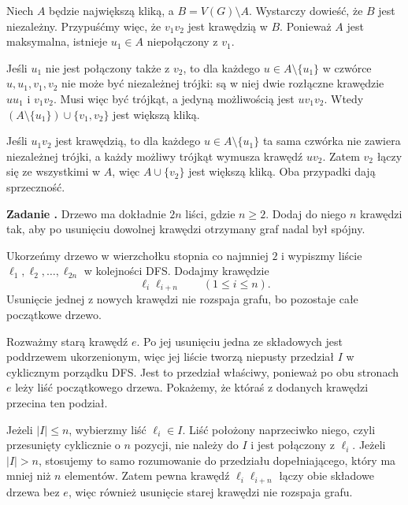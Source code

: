 \documentclass{lecture-kuznia}
\newcounter{zadanie}
\newenvironment{zadanie}[1]{%
	\refstepcounter{zadanie}%
	\par\medskip\noindent
	\textbf{Zadanie \thezadanie.}\quad
}{\par\medskip}
\begin{document}
\begin{solutionbox}
	Niech $A$ będzie największą kliką, a $B=V(G)\setminus A$. Wystarczy dowieść,
	że $B$ jest niezależny. Przypuśćmy więc, że $v_1v_2$ jest krawędzią w $B$.
	Ponieważ $A$ jest maksymalna, istnieje $u_1\in A$ niepołączony z $v_1$.

	Jeśli $u_1$ nie jest połączony także z $v_2$, to dla każdego
	$u\in A\setminus\{u_1\}$ w czwórce $u,u_1,v_1,v_2$ nie może być niezależnej
	trójki: są w niej dwie rozłączne krawędzie $uu_1$ i $v_1v_2$. Musi więc być
	trójkąt, a jedyną możliwością jest $uv_1v_2$. Wtedy
	$(A\setminus\{u_1\})\cup\{v_1,v_2\}$ jest większą kliką.

	Jeśli $u_1v_2$ jest krawędzią, to dla każdego $u\in A\setminus\{u_1\}$ ta sama czwórka nie
	zawiera niezależnej trójki, a każdy możliwy trójkąt wymusza krawędź
	$uv_2$. Zatem $v_2$ łączy się ze wszystkimi w $A$, więc $A\cup\{v_2\}$ jest
	większą kliką. Oba przypadki dają sprzeczność.
\end{solutionbox}

\begin{zadanie}{średnie} %
	Drzewo ma dokładnie $2n$ liści, gdzie $n\geqslant2$. Dodaj do niego $n$
	krawędzi tak, aby po usunięciu dowolnej krawędzi otrzymany graf nadal był
	spójny.
\end{zadanie}

\begin{solutionbox}
	Ukorzeńmy drzewo w wierzchołku stopnia co najmniej $2$ i wypiszmy liście
	$\ell_1,\ell_2,\dots,\ell_{2n}$ w kolejności DFS. Dodajmy krawędzie
	\[
		\ell_i\ell_{i+n}\qquad(1\leqslant i\leqslant n).
	\]
	Usunięcie jednej z nowych krawędzi nie rozspaja grafu, bo pozostaje całe
	początkowe drzewo.

	Rozważmy starą krawędź $e$. Po jej usunięciu jedna ze składowych jest
	poddrzewem ukorzenionym, więc jej liście tworzą niepusty przedział $I$ w
	cyklicznym porządku DFS. Jest to przedział właściwy, ponieważ po obu stronach
	$e$ leży liść początkowego drzewa. Pokażemy, że któraś z dodanych krawędzi
	przecina ten podział.

	Jeżeli $|I|\leqslant n$, wybierzmy liść $\ell_i\in I$. Liść położony
	naprzeciwko niego, czyli przesunięty cyklicznie o $n$ pozycji, nie należy do
	$I$ i jest połączony z $\ell_i$. Jeżeli $|I|>n$, stosujemy to samo
	rozumowanie do przedziału dopełniającego, który ma mniej niż $n$ elementów.
	Zatem pewna krawędź $\ell_i\ell_{i+n}$ łączy obie składowe drzewa bez $e$,
	więc również usunięcie starej krawędzi nie rozspaja grafu.
\end{solutionbox}
\end{document}
